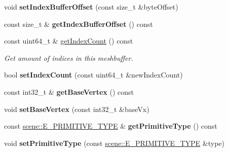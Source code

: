 \begin{DoxyCompactItemize}
\item 
void {\bfseries set\+Index\+Buffer\+Offset} (const size\+\_\+t \&byte\+Offset)\hypertarget{classirr_1_1scene_1_1IMeshBuffer_af06ccefb6f2825f13eeadcdf6880cfa7}{}\label{classirr_1_1scene_1_1IMeshBuffer_af06ccefb6f2825f13eeadcdf6880cfa7}

\item 
const size\+\_\+t \& {\bfseries get\+Index\+Buffer\+Offset} () const \hypertarget{classirr_1_1scene_1_1IMeshBuffer_a58e8b5abbe9627c89c377961b756cf96}{}\label{classirr_1_1scene_1_1IMeshBuffer_a58e8b5abbe9627c89c377961b756cf96}

\item 
const uint64\+\_\+t \& \hyperlink{classirr_1_1scene_1_1IMeshBuffer_aab91c05463d1cf3232c4f6255e14065d}{get\+Index\+Count} () const 
\begin{DoxyCompactList}\small\item\em Get amount of indices in this meshbuffer. \end{DoxyCompactList}\item 
bool {\bfseries set\+Index\+Count} (const uint64\+\_\+t \&new\+Index\+Count)\hypertarget{classirr_1_1scene_1_1IMeshBuffer_ae5ebcb1ecd31e8c6930ec5c037e2fa84}{}\label{classirr_1_1scene_1_1IMeshBuffer_ae5ebcb1ecd31e8c6930ec5c037e2fa84}

\item 
const int32\+\_\+t \& {\bfseries get\+Base\+Vertex} () const \hypertarget{classirr_1_1scene_1_1IMeshBuffer_a459873751dd41f9c3b1d66dbab976724}{}\label{classirr_1_1scene_1_1IMeshBuffer_a459873751dd41f9c3b1d66dbab976724}

\item 
void {\bfseries set\+Base\+Vertex} (const int32\+\_\+t \&base\+Vx)\hypertarget{classirr_1_1scene_1_1IMeshBuffer_a653a308af6252aed4c74ff4b2986e951}{}\label{classirr_1_1scene_1_1IMeshBuffer_a653a308af6252aed4c74ff4b2986e951}

\item 
const \hyperlink{namespaceirr_1_1scene_a5d7de82f2169761194b2f44d95cdc1dc}{scene\+::\+E\+\_\+\+P\+R\+I\+M\+I\+T\+I\+V\+E\+\_\+\+T\+Y\+PE} \& {\bfseries get\+Primitive\+Type} () const \hypertarget{classirr_1_1scene_1_1IMeshBuffer_ab84167de1015f1c6850ef1dd75c77182}{}\label{classirr_1_1scene_1_1IMeshBuffer_ab84167de1015f1c6850ef1dd75c77182}

\item 
void {\bfseries set\+Primitive\+Type} (const \hyperlink{namespaceirr_1_1scene_a5d7de82f2169761194b2f44d95cdc1dc}{scene\+::\+E\+\_\+\+P\+R\+I\+M\+I\+T\+I\+V\+E\+\_\+\+T\+Y\+PE} \&type)\hypertarget{classirr_1_1scene_1_1IMeshBuffer_aada06347c1195cdfd5e9e3955d842a9b}{}\label{classirr_1_1scene_1_1IMeshBuffer_aada06347c1195cdfd5e9e3955d842a9b}


\end{DoxyCompactItemize}
